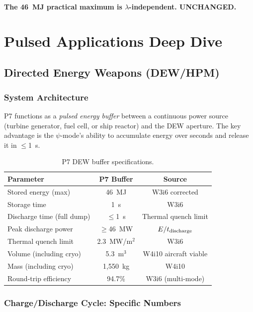 \documentclass[11pt]{article}
\begin{document}
\textbf{The 46~MJ practical maximum is $\lambda$-independent. UNCHANGED.}

\section{Pulsed Applications Deep Dive}\label{sec:pulsed}

\subsection{Directed Energy Weapons (DEW/HPM)}\label{sec:dew}

\subsubsection{System Architecture}

P7 functions as a \emph{pulsed energy buffer} between a continuous
power source (turbine generator, fuel cell, or ship reactor) and the
DEW aperture. The key advantage is the $\psi$-mode's ability to
accumulate energy over seconds and release it in $\leq$1~s.

\begin{table}[h]
\centering
\caption{P7 DEW buffer specifications.}
\label{tab:dew}
\begin{tabular}{@{}lcc@{}}
\toprule
\textbf{Parameter} & \textbf{P7 Buffer} & \textbf{Source} \\
\midrule
Stored energy (max) & 46~MJ & W3i6 corrected \\
Storage time & 1~s & W3i6 \\
Discharge time (full dump) & $\leq$1~s & Thermal quench limit \\
Peak discharge power & $\geq$46~MW & $E/t_{\rm discharge}$ \\
Thermal quench limit & 2.3~MW/m$^2$ & W3i6 \\
Volume (including cryo) & 5.3~m$^3$ & W4i10 aircraft viable \\
Mass (including cryo) & 1,550~kg & W4i10 \\
Round-trip efficiency & 94.7\% & W3i6 (multi-mode) \\
\bottomrule
\end{tabular}
\end{table}

\subsubsection{Charge/Discharge Cycle: Specific Numbers}
\end{document}
